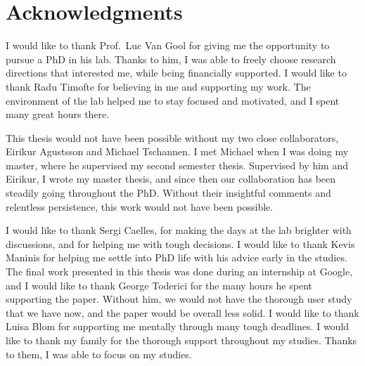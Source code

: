 
\begingroup
\let\clearpage\relax
\let\cleardoublepage\relax
\let\cleardoublepage\relax

\chapter*{Acknowledgments}

I would like to thank Prof.\ Luc Van Gool for giving me the opportunity to
pursue a PhD in his lab. Thanks to him, I was able to freely choose research
directions that interested me, while being financially supported.  
I would like to thank Radu Timofte for believing in me and supporting my work.
The environment of the lab helped me to stay focused and motivated, and I spent
many great hours there.

This thesis would not have been possible without my two close collaborators,
Eirikur Agustsson and Michael Tschannen.  I met Michael when I was doing
my master, where he supervised my second semester thesis. Supervised by him and
Eirikur, I wrote my master thesis, and since then our collaboration has been
steadily going throughout the PhD. Without their insightful comments and
relentless persistence, this work would not have been possible. 

I would like to thank Sergi Caelles, for making the days at the lab brighter
with discussions, and for helping me with tough decisions. I would like to
thank Kevis Maninis for helping me settle into PhD life with his advice early
in the studies.
The final work presented in this thesis was done during an internship at
Google, and I would like to thank George Toderici for the many hours he spent
supporting the paper. Without him, we would not have the thorough user study
that we have now, and the paper would be overall less solid.
I would like to thank Luisa Blom for supporting me mentally
through many tough deadlines.
I would like to thank my family for the thorough support throughout
my studies. Thanks to them, I was able to focus on my studies.



\endgroup
